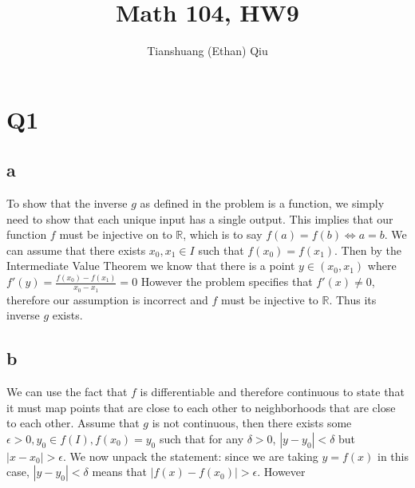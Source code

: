 \documentclass[12pt]{article}
\author{Tianshuang (Ethan) Qiu}
\newcommand{\R}{\mathbb{R}}
\begin{document}
\title{Math 104, HW9}
\maketitle
\newpage

\section{Q1}
\subsection{a}
To show that the inverse $g$ as defined in the problem is a function, we simply need to show that each unique input has a single output. This implies that our function $f$ must be injective on to $\R$, which is to say $f(a) = f(b) \iff a = b$.
\newline
We can assume that there exists $x_0, x_1 \in I$ such that $f(x_0) = f(x_1)$.
Then by the Intermediate Value Theorem we know that there is a point $y \in (x_0, x_1)$ where $f'(y) = \frac{f(x_0)-f(x_1)}{x_0-x_1}=0$
However the problem specifies that $f'(x) \not= 0$, therefore our assumption is incorrect and $f$ must be injective to $\R$. Thus its inverse $g$ exists.

\subsection{b}
We can use the fact that $f$ is differentiable and therefore continuous to state that it must map points that are close to each other to neighborhoods that are close to each other.
\newline
Assume that $g$ is not continuous, then there exists some $\epsilon > 0, y_0 \in f(I), f(x_0)=y_0$ such that for any $\delta > 0$, $|y-y_0|<\delta$ but $|x-x_0|>\epsilon$.
We now unpack the statement: since we are taking $y=f(x)$ in this case, $|y-y_0|<\delta$ means that $|f(x)-f(x_0)|>\epsilon$.
\newline
However
\end{document}
